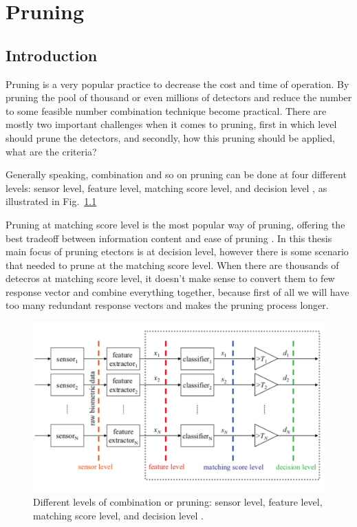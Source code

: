 \chapter{Pruning} \label{chapter3}


 \section{Introduction}
\label{sec:chap3-introduction}

Pruning is a very popular practice to decrease the cost and time of operation. By pruning the pool of thousand or even millions of detectors and reduce the number to some feasible number combination technique become practical. There are mostly two important challenges when it comes to pruning, first in which level should prune the detectors, and secondly, how this pruning should be applied, what are the criteria?

Generally speaking, combination and so on pruning can be done at four different levels: sensor level, feature level, matching score level, and decision level \cite{Tao2009}, as illustrated in Fig.~\ref{fig::level_of_pruning}

Pruning at matching score level is the most popular way of pruning, offering the best tradeoff between information content and ease of pruning \cite{Tao2009}. In this thesis main focus of pruning etectors is at decision level, however there is some scenario that needed to prune at the matching score level. When there are thousands of detecros at matching score level, it doesn't make sense to convert them to few response vector and combine everything together, because first of all we will have too many redundant response vectors and makes the pruning process longer.


\begin{figure}[]
\centering
\includegraphics[width=1\linewidth]{figs/level-of-pruning}
\caption{Different levels of combination or pruning: sensor level, feature level, matching score level, and decision level \cite{Tao2009}.}
\label{fig::level_of_pruning}
\end{figure}

